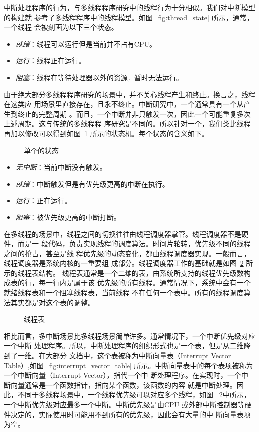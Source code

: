 中断处理程序的行为，与多线程程序研究中的线程行为十分相似。我们对中断模型的构建就
参考了多线程程序中的线程模型。如图~\ref{fig:thread_state} 所示，通常，一个线程
会被刻画为以下三个状态。
\begin{itemize}
	\item \emph{就绪}：线程可以运行但是当前并不占有CPU。
	\item \emph{运行}：线程正在运行。
	\item \emph{阻塞}：线程在等待处理器以外的资源，暂时无法运行。
\end{itemize}
由于绝大部分多线程程序研究的场景中，并不关心线程产生和终止。换言之，线程在这类应
用场景里直接存在，且永不终止。中断研究中，一个通常具有一个从产生到终止的完整周期
。而且，一个中断并非只触发一次，因此一个可能重复多次上述周期。这与传统的多线程程
序研究是不同的。所以针对一个，我们类比线程再加以修改可以得到如图~\ref{fig:interrupt_state} 
所示的状态机。每个状态的含义如下。

\begin{figure}[H]
	\centering
	
	\caption{单个的状态}
	\label{fig:interrupt_state}
\end{figure}

\begin{itemize}
	\item \emph{无中断}：当前中断没有触发。
	\item \emph{就绪}：中断触发但是有优先级更高的中断在执行。
	\item \emph{运行}：正在运行。
	\item \emph{阻塞}：被优先级更高的中断打断。
\end{itemize}

在多线程的场景中，线程之间的切换往往由线程调度器掌管。线程调度器不是硬件，而是一
段代码，负责实现线程的调度算法。时间片轮转，优先级不同的线程之间的抢占，甚至是线
程优先级的动态变化，都由线程调度器实现。一般而言，线程调度器是系统内核的一重要组
成部分。线程调度器工作的基础就是如图~\ref{fig:thread_table} 所示的线程表结构。
线程表通常是一个二维的表，由系统所支持的线程优先级数构成表的行，每一行内是属于该
优先级的所有线程。通常情况下，系统中会有一个就绪线程表和一个阻塞线程表，当前线程
不在任何一个表中。所有的线程调度算法其实都是对这个表的调整。

\begin{figure}
	\centering
	
	\caption{线程表}
	\label{fig:thread_table}
\end{figure}

相比而言，多中断场景比多线程场景简单许多。通常情况下，一个中断优先级对应一个中断
处理程序。所以，中断处理程序的组织形式也是一个表，但是从二维降到了一维。在大部分
文档中，这个表被称为中断向量表（Interrupt Vector Table）,如图~\ref{fig:interrupt_vector_table} 
所示。中断向量表中的每个表项被称为一个中断向量（Interrupt Vector），指代一个中
断处理程序。在实现时，一个中断向量通常是一个函数指针，指向某个函数，该函数的内容
就是中断处理。因此，不同于多线程场景中，一个线程优先级可以对应多个线程，如图~
\ref{fig:thread_table}中所示，一个中断优先级对应最多一个中断。中断优先级是由CPU
或外部中断控制器等硬件决定的，实际使用时可能用不到所有的优先级，因此会有大量的中
断向量表项为空。

